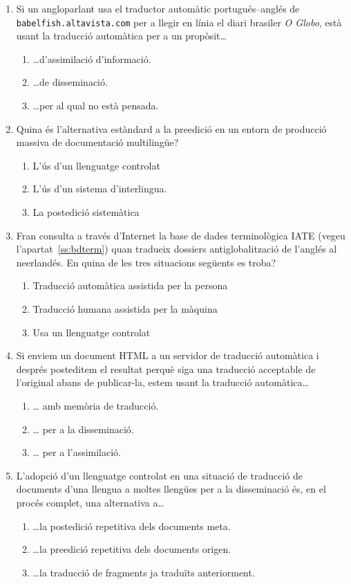 \begin{enumerate}
\item Si un angloparlant usa el traductor automàtic portugués--anglés
  de \verb|babelfish.altavista.com| per a llegir en línia el diari
  brasiler \emph{O Globo}, està usant la traducció automàtica per a
  un propòsit\ldots
  \begin{enumerate}
  \item \ldots d'assimilació d'informació.
  \item \ldots de disseminació.
  \item \ldots per al qual no està pensada.
  \end{enumerate}

\item Quina és l'alternativa estàndard a la preedició en un entorn de
  producció massiva de documentació multilingüe?
  \begin{enumerate}
  \item L'ús d'un llenguatge controlat
  \item L'ús d'un sistema d'interlingua.
  \item La postedició sistemàtica
  \end{enumerate}

\item Fran consulta a través d'Internet la base de dades terminològica
  IATE (vegeu l'apartat~\ref{ss:bdterm}) quan tradueix dossiers
  antiglobalització de l'anglés al neerlandés. En quina de les tres
  situacions següents es troba?
  \begin{enumerate}
  \item Traducció automàtica assistida per la persona
  \item Traducció humana assistida per la màquina
  \item Usa un llenguatge controlat
\end{enumerate}

\item Si enviem un document HTML a un servidor de traducció automàtica
  i després posteditem el resultat perquè siga una traducció
  acceptable de l'original abans de publicar-la, estem usant la
  traducció automàtica{\ldots}   
  \begin{enumerate}
  \item {\ldots} amb memòria de traducció.
  \item {\ldots} per a la disseminació.
  \item {\ldots} per a l'assimilació.
  \end{enumerate}

\item L'adopció d'un llenguatge controlat en una situació de traducció
  de documents d'una llengua a moltes llengües per a la disseminació
  és, en el procés complet, una alternativa a{\ldots}
  \begin{enumerate}
  \item {\ldots}la postedició repetitiva dels documents meta.
  \item {\ldots}la preedició repetitiva dels documents origen.
  \item {\ldots}la traducció de fragments ja traduïts anteriorment.
  \end{enumerate}


\end{enumerate}
